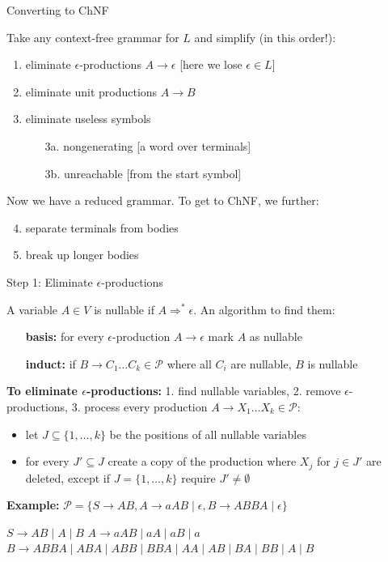 \documentclass[handout]{beamer}
\begin{document}
\begin{frame}{Converting to ChNF}

	Take any context-free grammar for $L$ and simplify (\alert{in this order!}):
	
	\begin{enumerate}
		\item eliminate \alert{$\epsilon$-productions} $A\to\epsilon$
		\hfill{\small [here we lose $\epsilon\in L$]}
		\item eliminate \alert{unit productions} $A\to B$
		\item eliminate \alert{useless} symbols
		\begin{itemize}
			\item[3a.] \alert{nongenerating} \hfill[a word over terminals]
			\item[3b.] \alert{unreachable} \hfill[from the start symbol]
		\end{itemize} 
	\end{enumerate}

	Now we have a \alert{reduced} grammar. To get to ChNF, we further:
		
	\begin{enumerate}\setcounter{enumi}{3}
		\item \alert{separate} terminals from bodies
		\item \alert{break up} longer bodies
	\end{enumerate}

\end{frame}


\begin{frame}{Step 1: Eliminate $\epsilon$-productions}

	A variable $A\in V$ is \alert{nullable} if $A\Rightarrow^* \epsilon$. An algorithm to find them:
	\begin{itemize}
		\item[\textbf{basis:}] for every $\epsilon$-production $A\to \epsilon$ mark $A$ as nullable
		\item[\textbf{induct:}] if $B\to C_1 \ldots C_k\in\mathcal P$ where all $C_i$ are nullable, $B$ is nullable
	\end{itemize}

	\textbf{To eliminate $\epsilon$-productions:} 1. find nullable variables, 2. remove $\epsilon$-productions, 3. process every production $A\to X_1\ldots X_k \in \mathcal P$:
	\begin{itemize}
		\item let $J\subseteq\{1,\dots,k\}$ be the positions of all nullable variables
		\item for every $J'\subseteq J$ create a copy of the production where $X_j$ for $j\in J'$ are deleted, except if $J=\{1,\dots,k\}$ require $J'\neq\emptyset$
	\end{itemize}

	\textbf{Example:} $\mathcal P=\{S\to AB,A\to aAB\mid\epsilon,B\to ABBA\mid\epsilon\}$

	$S\to AB\mid A\mid B$
	$A\to aAB\mid aA\mid aB\mid a$
	$B\to ABBA\mid ABA\mid ABB\mid BBA\mid AA\mid AB\mid BA\mid BB\mid A\mid B$

\end{frame}
\end{document}
